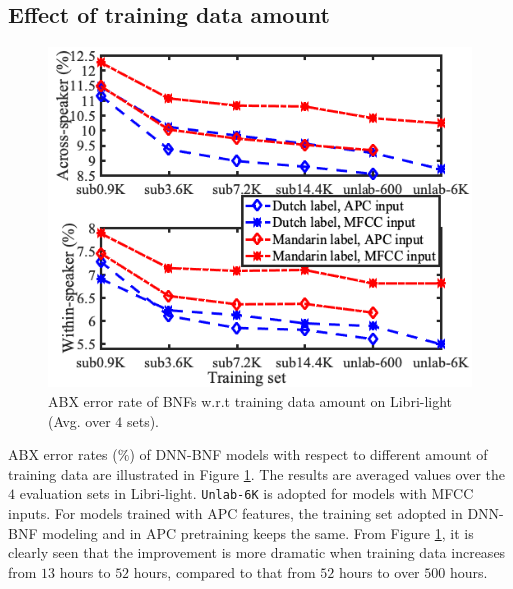 \documentclass[a4paper]{article}
\begin{document}



\subsection{Effect of  training data amount}
\begin{figure}[!t]
    \centering
    \includegraphics[width=0.75\linewidth]{LaTeX/crsling_dnn_bnf_apc_input_vert.png}
    \caption{ABX error rate of BNFs w.r.t training data amount on Libri-light (Avg. over $4$ sets).}
    \label{fig:dnn_bnf_data_amount}
\end{figure}
ABX error rates ($\%$) of  DNN-BNF models with respect to different amount of training data are illustrated in Figure \ref{fig:dnn_bnf_data_amount}. The results are averaged values over the $4$ evaluation sets in  Libri-light. \texttt{Unlab-6K}  is  adopted for models with MFCC inputs. For models trained with APC features, the training set adopted in DNN-BNF modeling and in APC pretraining keeps the same. From Figure \ref{fig:dnn_bnf_data_amount}, it is clearly seen that 
the improvement is more dramatic when training data increases from $13$ hours to $52$ hours, compared to   that from $52$ hours to over $500$ hours. 
\end{document}
